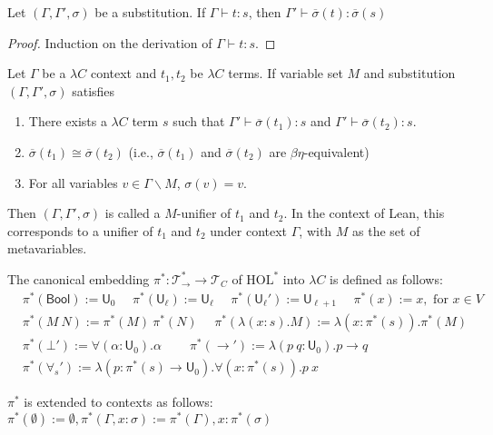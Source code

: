 \begin{theorem}
  Let $(\Gamma, \Gamma', \sigma)$ be a substitution. If $\Gamma \vdash t : s$, then $\Gamma' \vdash \overline{\sigma}(t) : \overline{\sigma}(s)$
\end{theorem}
\begin{proof} Induction on the derivation of $\Gamma \vdash t : s$.
\end{proof}

\begin{definition} Let $\Gamma$ be a $\lambda C$ context and $t_1, t_2$ be $\lambda C$ terms.
  If variable set $M$ and substitution $(\Gamma, \Gamma', \sigma)$ satisfies
  \begin{enumerate}
    \item There exists a $\lambda C$ term $s$ such that $\Gamma' \vdash \overline{\sigma}(t_1) : s$ and $\Gamma' \vdash \overline{\sigma}(t_2) : s$.
    \item $\overline{\sigma}(t_1) \cong \overline{\sigma}(t_2)$ (i.e., $\overline{\sigma}(t_1)$ and
      $\overline{\sigma}(t_2)$ are $\beta\eta$-equivalent)
    \item For all variables $v \in \Gamma \backslash M$, $\sigma(v) = v$.
  \end{enumerate}
  Then $(\Gamma, \Gamma', \sigma)$ is called a $M$-unifier of $t_1$ and $t_2$. In the context of Lean,
  this corresponds to a unifier of $t_1$ and $t_2$ under context $\Gamma$, with $M$ as the set of metavariables.
\end{definition}

\begin{definition} The canonical embedding $\pi^* : \mathcal{T}_\to^* \to \mathcal{T}_C$ of $\text{HOL}^*$ into $\lambda C$ is defined as follows:
  $$\begin{aligned}
  & \pi^*(\mathsf{Bool}) := \mathsf{U}_0 \ \ \ \ \ \ \pi^*(\mathsf{U}_\ell) := \mathsf{U}_\ell \ \ \ \ \ \
    \pi^*(\mathsf{U}_\ell') := \mathsf{U}_{\ell + 1} \ \ \ \ \ \ \pi^*(x) := x, \text{ for } x \in V \\
    & \pi^*(M \ N) := \pi^*(M) \ \pi^*(N) \ \ \ \ \ \ \pi^*(\lambda (x : s). M) := \lambda (x : \pi^*(s)). \pi^*(M) \\
  & \pi^*(\bot') := \forall (\alpha : \mathsf{U}_0). \alpha \ \ \ \ \ \ \ \ \ \
  \pi^*(\to') := \lambda (p \ q : \mathsf{U}_0). p \to q \\
  & \pi^*(\forall_s') := \lambda (p : \pi^*(s) \to \mathsf{U}_0). \forall (x : \pi^*(s)). p \ x
  \end{aligned}$$

  \noindent $\pi^*$ is extended to contexts as follows: $\pi^*(\emptyset) := \emptyset, \pi^*(\Gamma, x : \sigma) := \pi^*(\Gamma), x : \pi^*(\sigma)$


\end{definition}

